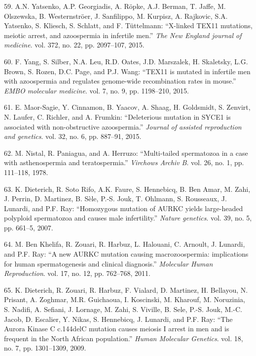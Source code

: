 \documentclass[12pt,twoside]{reedthesis}
\theoremstyle{definition}
\theoremstyle{definition}
\theoremstyle{remark}
\begin{document}
  \hypertarget{ref-Yatsenko2015}{}
  59. A.N. Yatsenko, A.P. Georgiadis, A. Röpke, A.J. Berman, T. Jaffe, M.
  Olszewska, B. Westernströer, J. Sanfilippo, M. Kurpisz, A. Rajkovic,
  S.A. Yatsenko, S. Kliesch, S. Schlatt, and F. Tüttelmann: ``X-linked
  TEX11 mutations, meiotic arrest, and azoospermia in infertile men.''
  \emph{The New England journal of medicine}. vol. 372, no. 22, pp.
  2097--107, 2015.
  
  \hypertarget{ref-Yang2015}{}
  60. F. Yang, S. Silber, N.A. Leu, R.D. Oates, J.D. Marszalek, H.
  Skaletsky, L.G. Brown, S. Rozen, D.C. Page, and P.J. Wang: ``TEX11 is
  mutated in infertile men with azoospermia and regulates genome-wide
  recombination rates in mouse.'' \emph{EMBO molecular medicine}. vol. 7,
  no. 9, pp. 1198--210, 2015.
  
  \hypertarget{ref-Maor-Sagie2015}{}
  61. E. Maor-Sagie, Y. Cinnamon, B. Yaacov, A. Shaag, H. Goldsmidt, S.
  Zenvirt, N. Laufer, C. Richler, and A. Frumkin: ``Deleterious mutation
  in SYCE1 is associated with non-obstructive azoospermia.'' \emph{Journal
  of assisted reproduction and genetics}. vol. 32, no. 6, pp. 887--91,
  2015.
  
  \hypertarget{ref-Nistal}{}
  62. M. Nistal, R. Paniagua, and A. Herruzo: ``Multi-tailed spermatozoa
  in a case with asthenospermia and teratospermia.'' \emph{Virchows Archiv
  B}. vol. 26, no. 1, pp. 111--118, 1978.
  
  \hypertarget{ref-Dieterich2007}{}
  63. K. Dieterich, R. Soto Rifo, A.K. Faure, S. Hennebicq, B. Ben Amar,
  M. Zahi, J. Perrin, D. Martinez, B. Sèle, P.-S. Jouk, T. Ohlmann, S.
  Rousseaux, J. Lunardi, and P.F. Ray: ``Homozygous mutation of AURKC
  yields large-headed polyploid spermatozoa and causes male infertility.''
  \emph{Nature genetics}. vol. 39, no. 5, pp. 661--5, 2007.
  
  \hypertarget{ref-BenKhelifa2011}{}
  64. M. Ben Khelifa, R. Zouari, R. Harbuz, L. Halouani, C. Arnoult, J.
  Lunardi, and P.F. Ray: ``A new AURKC mutation causing macrozoospermia:
  implications for human spermatogenesis and clinical diagnosis.''
  \emph{Molecular Human Reproduction}. vol. 17, no. 12, pp. 762--768,
  2011.
  
  \hypertarget{ref-Dieterich2009}{}
  65. K. Dieterich, R. Zouari, R. Harbuz, F. Vialard, D. Martinez, H.
  Bellayou, N. Prisant, A. Zoghmar, M.R. Guichaoua, I. Koscinski, M.
  Kharouf, M. Noruzinia, S. Nadifi, A. Sefiani, J. Lornage, M. Zahi, S.
  Viville, B. Sele, P.-S. Jouk, M.-C. Jacob, D. Escalier, Y. Nikas, S.
  Hennebicq, J. Lunardi, and P.F. Ray: ``The Aurora Kinase C c.144delC
  mutation causes meiosis I arrest in men and is frequent in the North
  African population.'' \emph{Human Molecular Genetics}. vol. 18, no. 7,
  pp. 1301--1309, 2009.
  
\end{document}
